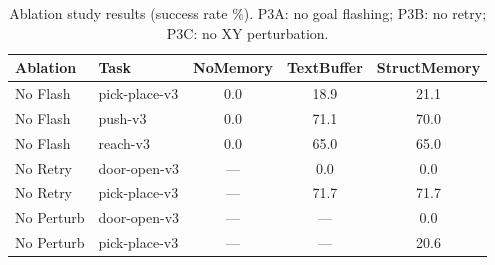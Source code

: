 \begin{table}[htbp]
\centering
\caption{Ablation study results (success rate \%). P3A: no goal flashing; P3B: no retry; P3C: no XY perturbation.}
\label{tab:ablation}
\begin{tabular}{llccc}
\toprule
Ablation & Task & NoMemory & TextBuffer & StructMemory \\
\midrule
No Flash & pick-place-v3 & 0.0 & 18.9 & 21.1 \\
No Flash & push-v3 & 0.0 & 71.1 & 70.0 \\
No Flash & reach-v3 & 0.0 & 65.0 & 65.0 \\
\midrule
No Retry & door-open-v3 & — & 0.0 & 0.0 \\
No Retry & pick-place-v3 & — & 71.7 & 71.7 \\
\midrule
No Perturb & door-open-v3 & — & — & 0.0 \\
No Perturb & pick-place-v3 & — & — & 20.6 \\
\bottomrule
\end{tabular}
\end{table}